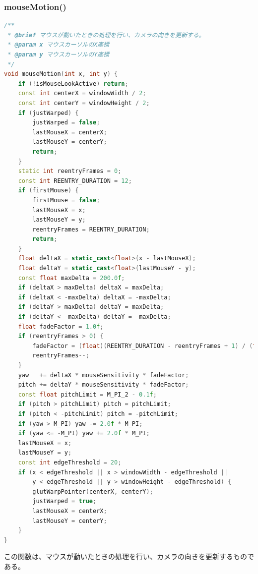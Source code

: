 \documentclass[uplatex,dvipdfmx,a4paper]{jsarticle}
\begin{document}
\hypertarget{func:mouseMotion}{}\subsubsection{mouseMotion()}\label{func:mouseMotion}
\begin{lstlisting}[language=C++, caption={mouseMotion() 関数}, label={lst:mouseMotion_detail}]
/**
 * @brief マウスが動いたときの処理を行い、カメラの向きを更新する。
 * @param x マウスカーソルのX座標
 * @param y マウスカーソルのY座標
 */
void mouseMotion(int x, int y) {
    if (!isMouseLookActive) return;
    const int centerX = windowWidth / 2;
    const int centerY = windowHeight / 2;
    if (justWarped) {
        justWarped = false;
        lastMouseX = centerX;
        lastMouseY = centerY;
        return;
    }
    static int reentryFrames = 0;
    const int REENTRY_DURATION = 12;
    if (firstMouse) {
        firstMouse = false;
        lastMouseX = x;
        lastMouseY = y;
        reentryFrames = REENTRY_DURATION;
        return;
    }
    float deltaX = static_cast<float>(x - lastMouseX);
    float deltaY = static_cast<float>(lastMouseY - y);
    const float maxDelta = 200.0f;
    if (deltaX > maxDelta) deltaX = maxDelta;
    if (deltaX < -maxDelta) deltaX = -maxDelta;
    if (deltaY > maxDelta) deltaY = maxDelta;
    if (deltaY < -maxDelta) deltaY = -maxDelta;
    float fadeFactor = 1.0f;
    if (reentryFrames > 0) {
        fadeFactor = (float)(REENTRY_DURATION - reentryFrames + 1) / (float)REENTRY_DURATION;
        reentryFrames--;
    }
    yaw   += deltaX * mouseSensitivity * fadeFactor;
    pitch += deltaY * mouseSensitivity * fadeFactor;
    const float pitchLimit = M_PI_2 - 0.1f;
    if (pitch > pitchLimit) pitch = pitchLimit;
    if (pitch < -pitchLimit) pitch = -pitchLimit;
    if (yaw > M_PI) yaw -= 2.0f * M_PI;
    if (yaw <= -M_PI) yaw += 2.0f * M_PI;
    lastMouseX = x;
    lastMouseY = y;
    const int edgeThreshold = 20;
    if (x < edgeThreshold || x > windowWidth - edgeThreshold ||
        y < edgeThreshold || y > windowHeight - edgeThreshold) {
        glutWarpPointer(centerX, centerY);
        justWarped = true;
        lastMouseX = centerX;
        lastMouseY = centerY;
    }
}
\end{lstlisting}
この関数は、マウスが動いたときの処理を行い、カメラの向きを更新するものである。
\end{document}

